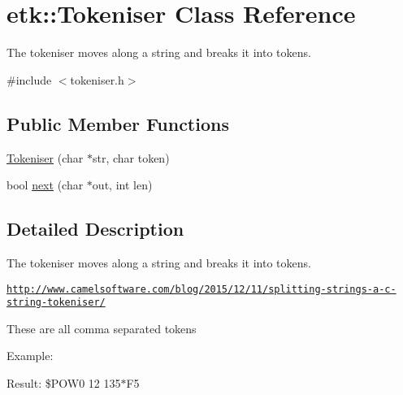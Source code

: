 \hypertarget{classetk_1_1_tokeniser}{\section{etk\-:\-:Tokeniser Class Reference}
\label{classetk_1_1_tokeniser}
}


The tokeniser moves along a string and breaks it into tokens.  




{\ttfamily \#include $<$tokeniser.\-h$>$}

\subsection*{Public Member Functions}
\begin{DoxyCompactItemize}
\item 
\hyperlink{classetk_1_1_tokeniser_a4c296b7ff45ca4d5fdee4a7870b350a8}{Tokeniser} (char $\ast$str, char token)
\item 
bool \hyperlink{classetk_1_1_tokeniser_ad2fc672e9143525962ea1f48eba6bed7}{next} (char $\ast$out, int len)
\end{DoxyCompactItemize}


\subsection{Detailed Description}
The tokeniser moves along a string and breaks it into tokens. 

\href{http://www.camelsoftware.com/blog/2015/12/11/splitting-strings-a-c-string-tokeniser/}{\tt http\-://www.\-camelsoftware.\-com/blog/2015/12/11/splitting-\/strings-\/a-\/c-\/string-\/tokeniser/}

These are all comma separated tokens 
 \begin{DoxyVerb}Example:
\end{DoxyVerb}
 
 Result\-: \$\-P\-O\-W0 12 135$\ast$\-F5 

